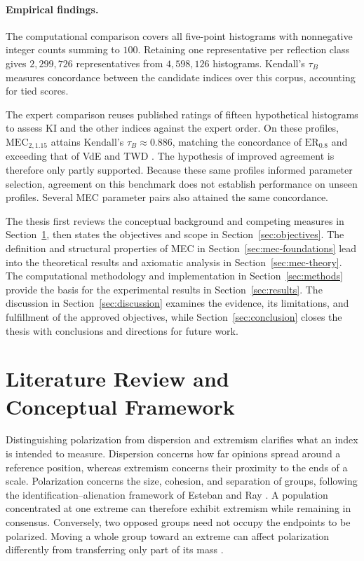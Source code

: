 \documentclass{article}
\theoremstyle{plain}
\theoremstyle{remark}
\begin{document}
\paragraph{Empirical findings.}
The computational comparison covers all five-point histograms with nonnegative integer counts summing to $100$. Retaining one representative per reflection class gives $2{,}299{,}726$ representatives from $4{,}598{,}126$ histograms. Kendall's $\tau_B$ measures concordance between the candidate indices over this corpus, accounting for tied scores.

The expert comparison reuses published ratings of fifteen hypothetical histograms \citep{koudenburg2021new} to assess KI and the other indices against the expert order. On these profiles, $\mathrm{MEC}_{2,1.15}$ attains Kendall's $\tau_B\approx0.886$, matching the concordance of $\mathrm{ER}_{0.8}$ and exceeding that of VdE and TWD \citep{aranda2026mec}. The hypothesis of improved agreement is therefore only partly supported. Because these same profiles informed parameter selection, agreement on this benchmark does not establish performance on unseen profiles. Several MEC parameter pairs also attained the same concordance.

The thesis first reviews the conceptual background and competing measures in Section~\ref{sec:lit}, then states the objectives and scope in Section~\ref{sec:objectives}. The definition and structural properties of MEC in Section~\ref{sec:mec-foundations} lead into the theoretical results and axiomatic analysis in Section~\ref{sec:mec-theory}. The computational methodology and implementation in Section~\ref{sec:methods} provide the basis for the experimental results in Section~\ref{sec:results}. The discussion in Section~\ref{sec:discussion} examines the evidence, its limitations, and fulfillment of the approved objectives, while Section~\ref{sec:conclusion} closes the thesis with conclusions and directions for future work.


\clearpage
\section[Literature Review and Conceptual Framework]{Literature Review and\\Conceptual Framework}\label{sec:lit}
\setlength{\emergencystretch}{2em}

Distinguishing polarization from dispersion and extremism clarifies what an index is intended to measure. Dispersion concerns how far opinions spread around a reference position, whereas extremism concerns their proximity to the ends of a scale. Polarization concerns the size, cohesion, and separation of groups, following the identification--alienation framework of Esteban and Ray \citep{esteban1994measurement}. A population concentrated at one extreme can therefore exhibit extremism while remaining in consensus. Conversely, two opposed groups need not occupy the endpoints to be polarized. Moving a whole group toward an extreme can affect polarization differently from transferring only part of its mass \citep{aranda2026mec}.
\end{document}
